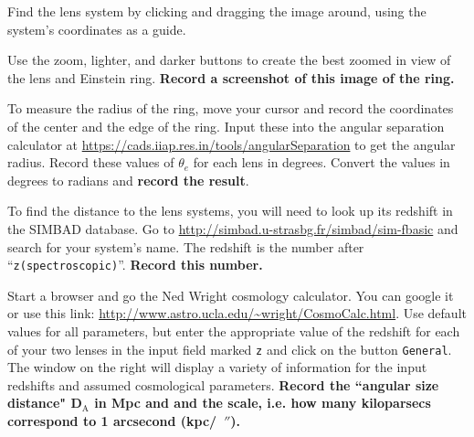\begin{steps}

	\item Find the lens system by clicking and dragging the image around, using the system's coordinates as a guide.
	
	\item Use the zoom, lighter, and darker buttons to create the best zoomed in view of the lens and Einstein ring. \textbf{Record a screenshot of this image of the ring.}
	
	\item To measure the radius of the ring, move your cursor and record the coordinates of the center and the edge of the ring. Input these into the angular separation calculator at \url{https://cads.iiap.res.in/tools/angularSeparation} to get the angular radius. Record these values of $\theta_e$ for
		each lens in degrees. Convert the values in degrees to radians
		and \textbf{record the result}.

	\item To find the distance to the lens systems, you will need to look up its redshift in the SIMBAD database. Go to \url{http://simbad.u-strasbg.fr/simbad/sim-fbasic} and search for your system's name. The redshift is the number after ``\texttt{z(spectroscopic)}''. \textbf{Record this number.}
	
	
	\item Start a browser and go the Ned Wright cosmology calculator. You
	can google it or use this link: \url{http://www.astro.ucla.edu/~wright/CosmoCalc.html}. Use
	default values for all parameters, but enter the appropriate value
	of the redshift for each of your two lenses in the input field
	marked \texttt{z} and click on the button \texttt{General}. The window on
	the right will display a variety of information for the input
	redshifts and assumed cosmological parameters. \textbf{Record the ``angular
	size distance" D$_\textrm{A}$ in Mpc and and the scale, i.e. how many kiloparsecs
	correspond to 1 arcsecond (kpc/\ $''$).}
	

\end{steps}
